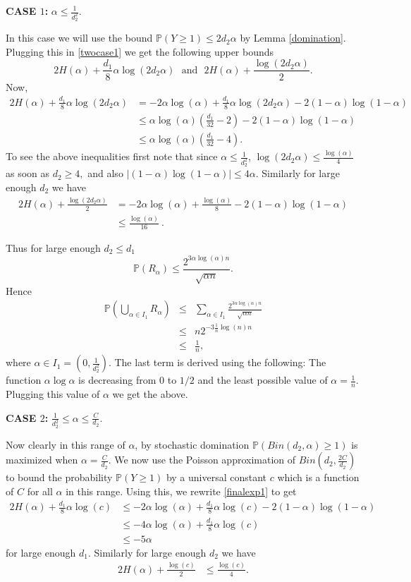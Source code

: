 \documentclass[11pt,reqno]{amsart}
\begin{document}
\textbf{CASE $1$:} 
$\alpha \le \frac{1}{d^2_2}$.

In this case we will use the bound $\mathbb{P}(Y\ge 1)\le 2d_2 \alpha$  by Lemma \ref{domination}.
Plugging this in \eqref{twocase1} we get the following upper bounds 
$$2H(\alpha)+\frac{d_1}{8}\alpha\log(2d_2 \alpha)~~~\mbox{and}~~~2H(\alpha)+\frac{\log(2d_2 \alpha)}{2}.$$
Now,
\begin{align*}
2H(\alpha)+\frac{d_1}{8}\alpha\log(2d_2 \alpha)& =  -2\alpha \log(\alpha)+\frac{d_1}{8}\alpha\log(2d_2 \alpha) -2(1-\alpha)\log(1-\alpha)\\
&\le  \alpha \log(\alpha)(\frac{d_1}{32}-2)-2(1-\alpha)\log(1-\alpha)\\
& \le \alpha \log(\alpha)(\frac{d_1}{32}-4).
\end{align*}
To see the above inequalities first note that since $\alpha \le \frac{1}{d_2^2}$, $\log(2d_2 \alpha) \le \frac{\log(\alpha)}{4} $ as soon as $d_2\ge 4,$ and also $|(1-\alpha)\log(1-\alpha)|\le 4\alpha.$
Similarly for large enough $d_2$ we have 
\begin{align*}
2H(\alpha)+\frac{\log(2d_2 \alpha)}{2}& =  -2\alpha \log(\alpha)+\frac{\log( \alpha)}{8} -2(1-\alpha)\log(1-\alpha)\\
& \le \frac{\log( \alpha)}{16}~.
\end{align*}

Thus for large enough $d_2\le d_1$ $$\mathbb{P}(R_{\alpha})\le \frac{2^{3\alpha \log(\alpha)n}}{\sqrt{\alpha n}}. $$
Hence \begin{eqnarray}
\mathbb{P}\left(\bigcup_{\alpha\in I_1}R_{\alpha}\right)
 &\le& \sum_{\alpha\in I_1}\frac{2^{3\alpha \log(\alpha)n}}{\sqrt{\alpha n}}\nonumber \\
 &\le& n 2^{-3\frac{1}{n}\log(n)n} \nonumber \\ 
 &\le&  \frac{1}{n}, \label{pop}
\end{eqnarray}
where $\alpha\in I_1=(0,\frac{1}{d_2^2})$. The last term is derived using the following:
 The function $\alpha \log \alpha $ is decreasing from $0$ to $1/2$ and the least possible value of $\alpha=\frac{1}{n}$. Plugging this value of $\alpha$  we get the above. 

\textbf{CASE $2$:}  $\frac{1}{d^2_2}\le \alpha \le \frac{C}{d_2}.$ 

Now clearly in this range of $\alpha$, by stochastic domination $\mathbb{P}(Bin(d_2,\alpha)\ge 1)$ is maximized when $\alpha=\frac{C}{d_2}.$
We now use the Poisson approximation of $Bin(d_2,\frac{2C}{d_2})$ to bound the probability $\mathbb{P}(Y\ge 1)$ by a universal constant $c$ which is a function of $C$ for  all $\alpha $ in this range.
Using this, we rewrite \eqref{finalexp1} to get 
\begin{align*}
2H(\alpha)+\frac{d_1}{8}\alpha\log(c)&\le  -2\alpha \log(\alpha)+\frac{d_1}{8}\alpha\log(c) -2(1-\alpha)\log(1-\alpha)\\
&\le -4\alpha \log (\alpha)+\frac{d_1}{8}\alpha \log(c)\\
&\le -5\alpha 
\end{align*}  
for large enough $d_1.$
Similarly for large enough $d_2$ we have 
\begin{align*}
2H(\alpha)+\frac{\log(c)}{2}& \le \frac{\log(c)}{4}.
\end{align*}
\end{document}
